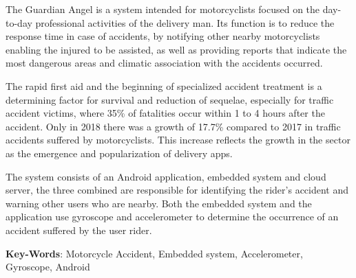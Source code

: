 \documentclass{utfpr-pg}
\begin{document}
 
 
 \begin{resumo}[Abstract]

The Guardian Angel is a system intended for motorcyclists focused on the day-to-day professional activities of the delivery man. Its function is to reduce the response time in case of accidents, by notifying other nearby motorcyclists enabling the injured to be assisted, as well as providing reports that indicate the most dangerous areas and climatic association with the accidents occurred.

The rapid  first aid and the beginning of specialized accident treatment is a determining factor for survival and reduction of sequelae, especially for traffic accident victims, where 35\% of fatalities occur within 1 to 4 hours after the accident. Only in 2018 there was a growth of 17.7\% compared to 2017 in traffic accidents suffered by motorcyclists. This increase reflects the growth in the sector as the emergence and popularization of delivery apps.

The system consists of an Android application, embedded system and cloud server, the three combined are responsible for identifying the rider's accident and warning other users who are nearby. Both the embedded system and the application use gyroscope and accelerometer to determine the occurrence of an accident suffered by the user rider.

\textbf{Key-Words}: Motorcycle Accident,  Embedded system, Accelerometer, Gyroscope, Android
 
 
 \end{resumo}







\listoffigures*
\clearpage
\listoftables*


\cleardoublepage








\tableofcontents*


\cleardoublepage


\textual
\pagestyle{simple}




\captionsetup{singlelinecheck = false, justification=raggedright, labelsep=space}








\clearpage
{}



\newpage
\end{document}
